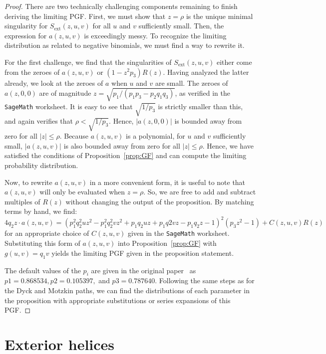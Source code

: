 \documentclass{article}
\DeclareMathOperator{\ex}{ext}
\begin{document}
\begin{proof}
There are two technically challenging components remaining to finish deriving the limiting PGF.  First, we must show that $z = \rho$ is the unique minimal singularity for $S_{\ex}(z, u, v)$ for all $u$ and $v$ sufficiently small.  Then, the expression for $a(z, u, v)$ is exceedingly messy.  To recognize the limiting distribution as related to negative binomials, we must find a way to rewrite it.

For the first challenge, we find that the singularities of $S_{\ex}(z, u, v)$ either come from the zeroes of $a(z, u, v)$ or $(1-z^2p_3)R(z)$.  Having analyzed the latter already, we look at the zeroes of $a$ when $u$ and $v$ are small.  The zeroes of $a(z, 0, 0)$ are of magnitude $z = \sqrt{p_1/(p_1p_3 - p_2q_1q_3)}$, as verified in the {\tt SageMath} worksheet.  It is easy to see that $\sqrt{1/p_3}$ is strictly smaller than this, and \cite[Lemma 3.3]{Poznanovic:2014} again verifies that $\rho < \sqrt{1/p_3}$.  Hence, $|a(z, 0, 0)|$ is bounded away from zero for all $|z| \leq \rho$.  Because $a(z, u, v)$ is a polynomial, for $u$ and $v$ sufficiently small, $|a(z, u, v)|$ is also bounded away from zero for all $|z| \leq \rho$.  Hence, we have satisfied the conditions of Proposition~\ref{prop:GF} and can compute the limiting probability distribution.

Now, to rewrite $a(z, u, v)$ in a more convenient form, it is useful to note that $a(z, u, v)$ will only be evaluated when $z = \rho$.  So, we are free to add and subtract multiples of $R(z)$ without changing the output of the proposition.  By matching terms by hand, we find:
\[
4q_2z \cdot a(z, u, v) = (p_1^2q_2^2uz^2 - p_1^2q_2^2vz^2 + p_1q_2uz + p_1q2vz - p_1q_2z - 1)^2(p_3z^2 - 1) + C(z, u, v)R(z)
\]
for an appropriate choice of $C(z, u, v)$ given in the {\tt SageMath} worksheet.  Substituting this form of $a(z, u, v)$ into Proposition~\ref{prop:GF} with $g(u, v) = q_1v$ yields the limiting PGF given in the proposition statement.

The default values of the $p_i$ are given in the original paper~\cite{Knudsen:2003} as $p1 = 0.868534, p2 = 0.105397,$ and $p3 = 0.787640$.  Following the same steps as for the Dyck and Motzkin paths, we can find the distributions of each parameter in the proposition with appropriate substitutions or series expansions of this PGF.
\end{proof}
%
%
%
%
%
%

\section{Exterior helices} \label{sec:Helices}
\end{document}
